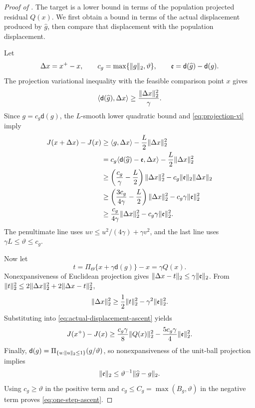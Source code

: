 \begin{proof}[Proof of ]
The target is a lower bound in terms of the population projected residual $Q(x)$.  We first obtain a bound in terms of the actual displacement produced by $\widehat g$, then compare that displacement with the population displacement.

Let
\[
 \Delta x=x^+-x,
 \qquad
 c_g=\max\{\lVert g\rVert_2,\vartheta\},
 \qquad
 \mathfrak e=\mathsf d(\widehat g)-\mathsf d(g).
\]
The projection variational inequality with the feasible comparison point $x$ gives
\begin{equation}\label{eq:projection-vi}
 \langle\mathsf d(\widehat g),\Delta x\rangle\ge\frac{\lVert\Delta x\rVert_2^2}{\gamma}.
\end{equation}
Since $g=c_g\mathsf d(g)$, the $L$-smooth lower quadratic bound and \eqref{eq:projection-vi} imply
\begin{align}
 J(x+\Delta x)-J(x)
 &\ge \langle g,\Delta x\rangle-\frac L2\lVert\Delta x\rVert_2^2\notag\\
 &=c_g\langle\mathsf d(\widehat g)-\mathfrak e,\Delta x\rangle
 -\frac L2\lVert\Delta x\rVert_2^2\notag\\
 &\ge\left(\frac{c_g}{\gamma}-\frac L2\right)\lVert\Delta x\rVert_2^2
 -c_g\lVert\mathfrak e\rVert_2\lVert\Delta x\rVert_2\notag\\
 &\ge\left(\frac{3c_g}{4\gamma}-\frac L2\right)\lVert\Delta x\rVert_2^2
 -c_g\gamma\lVert\mathfrak e\rVert_2^2\notag\\
 &\ge\frac{c_g}{4\gamma}\lVert\Delta x\rVert_2^2
 -c_g\gamma\lVert\mathfrak e\rVert_2^2.
 \label{eq:actual-displacement-ascent}
\end{align}
The penultimate line uses
$uv\le u^2/(4\gamma)+\gamma v^2$, and the last line uses
$\gamma L\le \vartheta\le c_g$.

Now let
\[
 t=\Pi_\Theta\{x+\gamma\mathsf d(g)\}-x=\gamma Q(x).
\]
Nonexpansiveness of Euclidean projection gives
$\lVert\Delta x-t\rVert_2\le\gamma\lVert\mathfrak e\rVert_2$.  From
$\lVert t\rVert_2^2\le2\lVert\Delta x\rVert_2^2+2\lVert\Delta x-t\rVert_2^2$,
\[
 \lVert\Delta x\rVert_2^2\ge\frac12\lVert t\rVert_2^2-\gamma^2\lVert\mathfrak e\rVert_2^2.
\]
Substituting into \eqref{eq:actual-displacement-ascent} yields
\[
 J(x^+)-J(x)
 \ge\frac{c_g\gamma}{8}\lVert Q(x)\rVert_2^2
 -\frac{5c_g\gamma}{4}\lVert\mathfrak e\rVert_2^2.
\]
Finally,
$\mathsf d(g)=\Pi_{\{u:\lVert u\rVert_2\le1\}}(g/\vartheta)$, so nonexpansiveness of the unit-ball projection implies
\[
 \lVert\mathfrak e\rVert_2\le \vartheta^{-1}\lVert\widehat g-g\rVert_2.
\]
Using $c_g\ge \vartheta$ in the positive term and
$c_g\le C_g=\max(B_g,\vartheta)$ in the negative term proves \eqref{eq:one-step-ascent}.
\end{proof}

